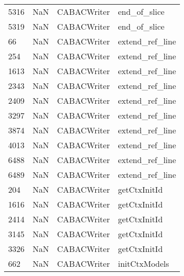 \begin{tabular}{llll}
5316 &                   NaN &                CABACWriter &                              end\_of\_slice \\
5319 &                   NaN &                CABACWriter &                              end\_of\_slice \\
66   &                   NaN &                CABACWriter &                           extend\_ref\_line \\
254  &                   NaN &                CABACWriter &                           extend\_ref\_line \\
1613 &                   NaN &                CABACWriter &                           extend\_ref\_line \\
2343 &                   NaN &                CABACWriter &                           extend\_ref\_line \\
2409 &                   NaN &                CABACWriter &                           extend\_ref\_line \\
3297 &                   NaN &                CABACWriter &                           extend\_ref\_line \\
3874 &                   NaN &                CABACWriter &                           extend\_ref\_line \\
4013 &                   NaN &                CABACWriter &                           extend\_ref\_line \\
6488 &                   NaN &                CABACWriter &                           extend\_ref\_line \\
6489 &                   NaN &                CABACWriter &                           extend\_ref\_line \\
204  &                   NaN &                CABACWriter &                              getCtxInitId \\
1616 &                   NaN &                CABACWriter &                              getCtxInitId \\
2414 &                   NaN &                CABACWriter &                              getCtxInitId \\
3145 &                   NaN &                CABACWriter &                              getCtxInitId \\
3326 &                   NaN &                CABACWriter &                              getCtxInitId \\
662  &                   NaN &                CABACWriter &                             initCtxModels \\

\end{tabular}
